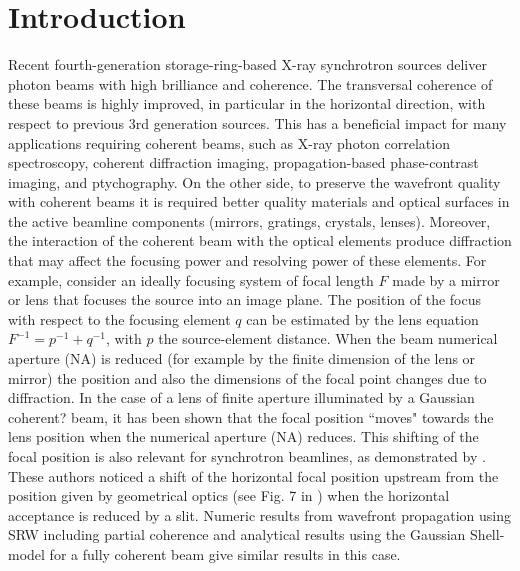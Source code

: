 \documentclass{iucr}              %
\newcommand{\inred}[1]{{\color{red}#1}}
\begin{document}
\section{Introduction}


Recent fourth-generation storage-ring-based X-ray synchrotron sources deliver photon beams with high brilliance and coherence. The transversal coherence of these beams is highly improved, in particular in the horizontal direction, with respect to previous 3rd generation sources. This has a beneficial impact for many applications requiring coherent beams, such as X-ray photon correlation spectroscopy, coherent diffraction imaging, propagation-based phase-contrast imaging, and ptychography. On the other side, to preserve the wavefront quality with coherent beams it is required better quality materials and optical surfaces in the active beamline components (mirrors, gratings, crystals, lenses). Moreover, the interaction of the coherent beam with the optical elements produce diffraction that may affect the focusing power and resolving power of these elements. For example, consider an ideally focusing system of focal length $F$ made by a mirror or lens that focuses the source into an image plane. The position of the focus with respect to the focusing element $q$ can be estimated by the lens equation $F^{-1}=p^{-1}+q^{-1}$, with $p$ the source-element distance. When the beam numerical aperture (NA) is reduced (for example by the finite dimension of the lens or mirror) the position and also the dimensions of the focal point changes due to diffraction. In the case of a lens of finite aperture illuminated by a Gaussian \inred{coherent?} beam, it has been shown \cite{Tanaka:85} that the focal position ``moves" towards the lens position when the numerical aperture (NA) reduces. This shifting of the focal position is also relevant for synchrotron beamlines, as demonstrated by \cite{westfahl}. These authors noticed a shift of the horizontal focal position upstream from the position given by geometrical optics (see Fig. 7 in \cite{westfahl}) when the horizontal acceptance is reduced by a slit. Numeric results from wavefront propagation using SRW \cite{codeSRW} including partial coherence and analytical results using the Gaussian Shell-model for a fully coherent beam give similar results in this case.
\end{document}
